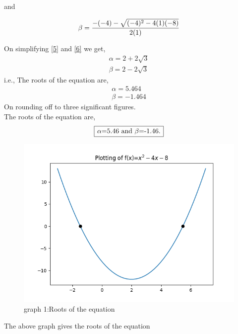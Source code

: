 \documentclass[journal,12pt,twocolumn]{IEEEtran}
\begin{document}
and

\begin{align} \label{6}
\beta =\Large \frac{-(-4)-\sqrt{(-4)^2-4(1)(-8)}}{2(1)}
\end{align}

On simplifying \eqref{5} and \eqref{6} we get,
\begin{align}
\alpha=2+2\sqrt{3}  \\ \beta=2-2\sqrt{3} 
\end{align}
i.e., The roots of the equation are,
\begin{align}
\alpha=5.464   \\ \beta=-1.464
\end{align}
On rounding off to three significant figures.
\\The roots of the equation are,
\begin{align} 
\framebox[1.1\width]{$\alpha$=5.46 and $\beta$=-1.46.}
\end{align}
\begin{figure}[h] 
\includegraphics[scale=0.65] 
{Figure_1}\large
\caption{graph 1:Roots of the equation}
\label{fig:a}
\end{figure}

\noindent The above graph \pageref{fig:a}   gives the roots of the equation 
\end{document}
